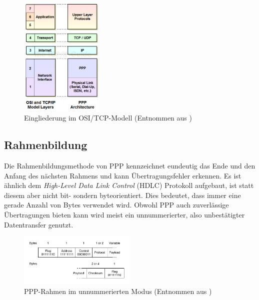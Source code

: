 \documentclass[journal,11pt]{IEEEtran}
\begin{document}
\begin{figure}[h!]
 \centering
  \includegraphics[width=0.35\textwidth]{img/ppplayers}
 \caption{Eingliederung im OSI/TCP-Modell (Entnommen aus \cite{ppposi})}
 \label{fig:osi}
\end{figure}

\subsection{Rahmenbildung}
Die Rahmenbildungsmethode von PPP kennzeichnet eundeutig das Ende und den Anfang des nächsten Rahmens und kann Übertragungsfehler erkennen. Es ist ähnlich dem \textit{High-Level Data Link Control} (HDLC) Protokoll aufgebaut, ist statt diesem aber nicht bit- sondern byteorientiert. Dies bedeutet, dass immer eine gerade Anzahl von Bytes verwendet wird. Obwohl PPP auch zuverlässige Übertragungen bieten kann wird meist ein unnummerierter, also unbestätigter Datentransfer genutzt.

\begin{figure}[h!]
 \centering
  \includegraphics[width=0.5\textwidth]{img/ppprahmen}
 \caption{PPP-Rahmen im unnummerierten Modus (Entnommen aus \cite{compnetzw})}
 \label{fig:ppprahmen}
\end{figure}
\end{document}
